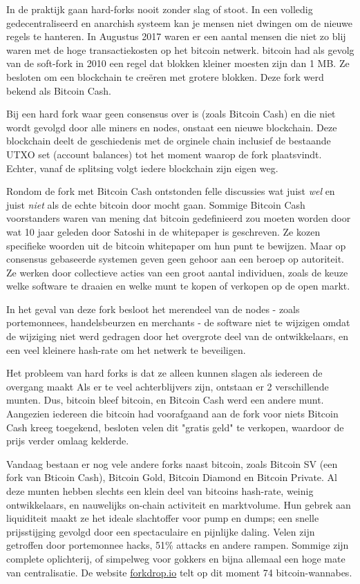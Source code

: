 \documentclass[
  letterpaper,
]{scrbook}
\begin{document}
In de praktijk gaan hard-forks nooit zonder slag of stoot. In een
volledig gedecentraliseerd en anarchish systeem kan je mensen niet
dwingen om de nieuwe regels te hanteren. In Augustus 2017 waren er een
aantal mensen die niet zo blij waren met de hoge transactiekosten op het
bitcoin netwerk. bitcoin had als gevolg van de soft-fork in 2010 een
regel dat blokken kleiner moesten zijn dan 1 MB. Ze besloten om een
blockchain te creëren met grotere blokken. Deze fork werd bekend als
Bitcoin Cash.

Bij een hard fork waar geen consensus over is (zoals Bitcoin Cash) en
die niet wordt gevolgd door alle miners en nodes, onstaat een nieuwe
blockchain. Deze blockchain deelt de geschiedenis met de orginele chain
inclusief de bestaande UTXO set (account balances) tot het moment waarop
de fork plaatsvindt. Echter, vanaf de splitsing volgt iedere blockchain
zijn eigen weg.

Rondom de fork met Bitcoin Cash ontstonden felle discussies wat juist
\emph{wel} en juist \emph{niet} als de echte bitcoin door mocht gaan.
Sommige Bitcoin Cash voorstanders waren van mening dat bitcoin
gedefinieerd zou moeten worden door wat 10 jaar geleden door Satoshi in
de whitepaper is geschreven. Ze kozen specifieke woorden uit de bitcoin
whitepaper om hun punt te bewijzen. Maar op consensus gebaseerde
systemen geven geen gehoor aan een beroep op autoriteit. Ze werken door
collectieve acties van een groot aantal individuen, zoals de keuze welke
software te draaien en welke munt te kopen of verkopen op de open markt.

In het geval van deze fork besloot het merendeel van de nodes - zoals
portemonnees, handelsbeurzen en merchants - de software niet te wijzigen
omdat de wijziging niet werd gedragen door het overgrote deel van de
ontwikkelaars, en een veel kleinere hash-rate om het netwerk te
beveiligen.

Het probleem van hard forks is dat ze alleen kunnen slagen als iedereen
de overgang maakt Als er te veel achterblijvers zijn, ontstaan er 2
verschillende munten. Dus, bitcoin bleef bitcoin, en Bitcoin Cash werd
een andere munt. Aangezien iedereen die bitcoin had voorafgaand aan de
fork voor niets Bitcoin Cash kreeg toegekend, besloten velen dit "gratis
geld" te verkopen, waardoor de prijs verder omlaag kelderde.

Vandaag bestaan er nog vele andere forks naast bitcoin, zoals Bitcoin SV
(een fork van Bticoin Cash), Bitcoin Gold, Bitcoin Diamond en Bitcoin
Private. Al deze munten hebben slechts een klein deel van bitcoins
hash-rate, weinig ontwikkelaars, en nauwelijks on-chain activiteit en
marktvolume. Hun gebrek aan liquiditeit maakt ze het ideale slachtoffer
voor pump en dumps; een snelle prijsstijging gevolgd door een
spectaculaire en pijnlijke daling. Velen zijn getroffen door portemonnee
hacks, 51\% attacks en andere rampen. Sommige zijn complete oplichterij,
of simpelweg voor gokkers en bijna allemaal een hoge mate van
centralisatie. De website \href{https://forkdrop.io/}{forkdrop.io} telt
op dit moment 74 bitcoin-wannabes.
\end{document}
